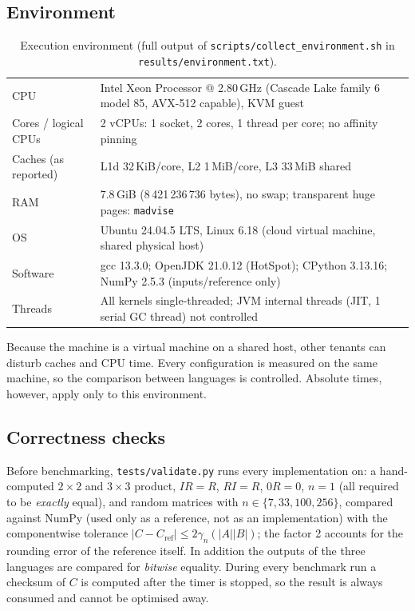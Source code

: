 \documentclass[10pt,a4paper]{article}
\begin{document}
\subsection{Environment}
\begin{table}[H]
\centering\small
\caption{Execution environment (full output of \texttt{scripts/collect\_environment.sh} in
\texttt{results/environment.txt}).}\label{tab:env}
\begin{tabular}{ll}
\toprule
CPU & Intel Xeon Processor @ 2.80\,GHz (Cascade Lake family 6 model 85, AVX-512 capable), KVM guest \\
Cores / logical CPUs & 2 vCPUs: 1 socket, 2 cores, 1 thread per core; no affinity pinning \\
Caches (as reported) & L1d 32\,KiB/core, L2 1\,MiB/core, L3 33\,MiB shared \\
RAM & 7.8\,GiB (8\,421\,236\,736 bytes), no swap; transparent huge pages: \texttt{madvise} \\
OS & Ubuntu 24.04.5 LTS, Linux 6.18 (cloud virtual machine, shared physical host) \\
Software & gcc 13.3.0; OpenJDK 21.0.12 (HotSpot); CPython 3.13.16; NumPy 2.5.3 (inputs/reference only) \\
Threads & All kernels single-threaded; JVM internal threads (JIT, 1 serial GC thread) not controlled \\
\bottomrule
\end{tabular}
\end{table}
Because the machine is a virtual machine on a shared host, other tenants can disturb caches and
CPU time. Every configuration is measured on the same machine, so the comparison between
languages is controlled. Absolute times, however, apply only to this environment.

\subsection{Correctness checks}
Before benchmarking, \texttt{tests/validate.py} runs every implementation on: a hand-computed
$2\times2$ and $3\times3$ product, $IR=R$, $RI=R$, $0R=0$, $n=1$ (all required to be
\emph{exactly} equal), and random matrices with $n\in\{7,33,100,256\}$, compared against NumPy
(used only as a reference, not as an implementation) with the componentwise tolerance
$|C-C_{\text{ref}}|\le 2\gamma_n(|A||B|)$; the factor 2 accounts for the rounding error of the
reference itself. In addition the outputs of the three languages are compared for
\emph{bitwise} equality. During every benchmark run a checksum of $C$ is computed after the
timer is stopped, so the result is always consumed and cannot be optimised away.
\end{document}
